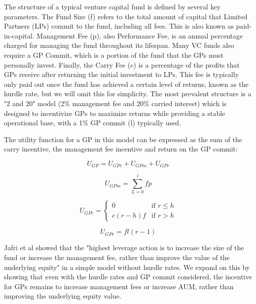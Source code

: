 \documentclass[a4paper, oneside]{discothesis}
\begin{document}
The structure of a typical venture capital fund is defined by several key parameters. The Fund Size (f) refers to the total amount of capital that Limited Partners (LPs) commit to the fund, including all fees. This is also known as paid-in-capital. Management Fee (p), also Performance Fee, is an annual percentage charged for managing the fund throughout its lifespan. Many VC funds also require a GP Commit, which is a portion of the fund that the GPs must personally invest. Finally, the Carry Fee (c) is a percentage of the profits that GPs receive after returning the initial investment to LPs. This fee is typically only paid out once the fund has achieved a certain level of returns, known as the hurdle rate, but we will omit this for simplicity. The most prevalent structure is a "2 and 20" model (2\% management fee and 20\% carried interest) which is designed to incentivize GPs to maximize returns while providing a stable operational base, with a 1\% GP commit (l) typically used. 

The utility function for a GP in this model can be expressed as the sum of the carry incentive, the management fee incentive and return on the GP commit:

\begin{equation}
U_{GP} = U_{GPc} + U_{GPm} + U_{GPr}
\end{equation}

\begin{equation}
U_{GPm} = \sum_{L=0}^l fp
\end{equation}

\begin{equation}
U_{GPc} = \begin{cases}
    0 & \text{if } r \leq h \\
    c(r-h)f & \text{if } r > h
    \end{cases}
\end{equation}

\begin{equation}
U_{GPr} = fl(r-1)
\end{equation}

Jafri et al showed that the "highest leverage action is to increase the size of the fund or increase the management fee, rather than improve the value of the underlying equity" \cite{Jafri_distributed_vc} in a simple model without hurdle rates. We expand on this by showing that even with the hurdle rates and GP commit considered, the incentive for GPs remains to increase management fees or increase AUM, rather than improving the underlying equity value.
\end{document}
